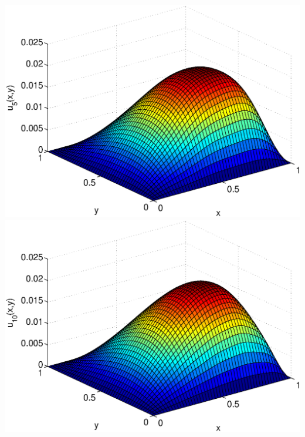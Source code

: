 \begin{solution}
\begin{enumerate}
\begin{center}
          \includegraphics[scale=0.37]{twoD5}\quad
          \includegraphics[scale=0.37]{twoD10}
      \end{center}



\end{enumerate}
\end{solution}